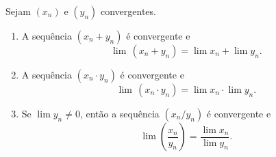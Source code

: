 \begin{theorem} \label{teo.calc1:algebra_das_sequencias}
    Sejam $(x_n)$ e $(y_n)$ convergentes.
        \begin{enumerate}[leftmargin=*, align=left, label=\textbf{(\alph*)}]
            \item A sequência $(x_n + y_n)$ é convergente e
                \[
                    \lim \, (x_n + y_n) = \lim x_n + \lim y_n.
                \]
            \item A sequência $(x_n \cdot y_n)$ é convergente e
                \[
                    \lim \, (x_n \cdot y_n) = \lim x_n \cdot \lim y_n.
                \]
            \item Se $\lim y_n \neq 0$, então a sequência $(x_n / y_n)$ é convergente e
                \[
                    \lim \left( \dfrac{x_n}{y_n} \right) = \dfrac{\lim x_n}{\lim y_n}.
                \]
        \end{enumerate}
\end{theorem}

